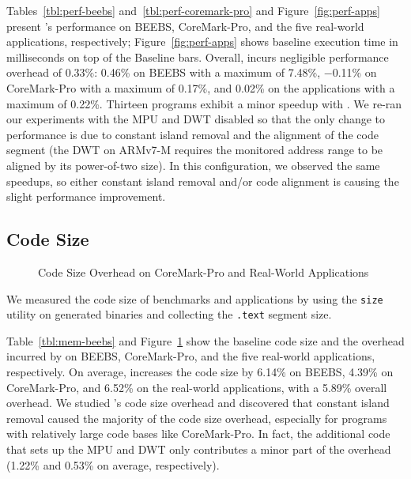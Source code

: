 Tables~\ref{tbl:perf-beebs} and~\ref{tbl:perf-coremark-pro}
and Figure~\ref{fig:perf-apps} present {\System}'s performance on BEEBS,
CoreMark-Pro, and the five real-world applications, respectively;
Figure~\ref{fig:perf-apps} shows
baseline execution time in milliseconds on top of the Baseline bars.
Overall, {\System} incurs negligible
performance overhead of 0.33\%: 0.46\% on BEEBS with a maximum of 7.48\%,
$-$0.11\% on CoreMark-Pro with a maximum of 0.17\%, and 0.02\% on
the applications with a maximum of 0.22\%.  Thirteen programs exhibit a
minor speedup with {\System}.  We re-ran our experiments with the MPU
and
DWT disabled so that the only change to performance is due to
constant island removal and the alignment of the code segment
(the DWT on ARMv7-M requires the monitored address range to be aligned
by its power-of-two size).
In this configuration, we observed the same speedups, so either
constant island removal and/or code alignment is causing the slight
performance improvement.

\subsection{Code Size}
\label{sec:eval:mem}



\begin{figure}[tb]
  \centering
  \caption{Code Size Overhead on CoreMark-Pro and Real-World Applications}
  \label{fig:mem-coremark-pro-apps}
\end{figure}

We measured the code size of benchmarks and applications by using the
{\tt size} utility on generated binaries and collecting the {\tt .text}
segment size.

Table~\ref{tbl:mem-beebs} and Figure~\ref{fig:mem-coremark-pro-apps}
show the baseline code size and the overhead
incurred by {\System} on BEEBS, CoreMark-Pro, and the five real-world
applications, respectively.  On average, {\System} increases the code
size by 6.14\% on BEEBS, 4.39\% on CoreMark-Pro, and 6.52\% on the
real-world applications, with a 5.89\% overall overhead.
We studied {\System}'s code size overhead and
discovered that constant island removal caused
the majority of the code size overhead, especially for programs with
relatively large code bases like
CoreMark-Pro.  In fact, the additional code that sets up the MPU
and DWT only contributes a minor part of the overhead (1.22\% and 0.53\%
on average, respectively).

